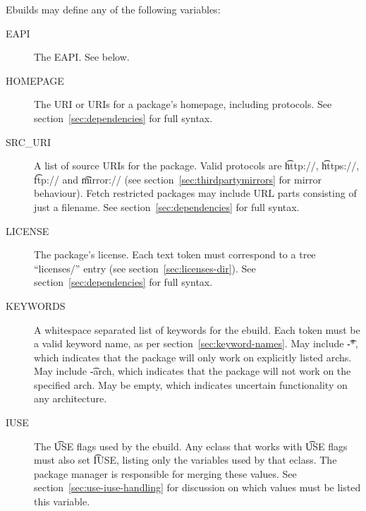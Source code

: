 Ebuilds may define any of the following variables:

\begin{description}
\item[EAPI] The EAPI. See below.
\item[HOMEPAGE] The URI or URIs for a package's homepage, including protocols.
    See section~\ref{sec:dependencies} for full syntax.
\item[SRC\_URI] A list of source URIs for the package. Valid protocols are \t{http://},
    \t{https://}, \t{ftp://} and \t{mirror://} (see section~\ref{sec:thirdpartymirrors} for mirror
    behaviour). Fetch restricted packages may include URL parts consisting of just a filename.
    See section~\ref{sec:dependencies} for full syntax.
\item[LICENSE] The package's license. Each text token must correspond to a tree ``licenses/'' entry
    (see section~\ref{sec:licenses-dir}). See section~\ref{sec:dependencies} for full syntax.
    \label{ebuild-var-LICENSE}
\item[KEYWORDS] A whitespace separated list of keywords for the ebuild. Each token must be a valid
    keyword name, as per section~\ref{sec:keyword-names}. May include \t{-*}, which indicates that
    the package will only work on explicitly listed archs. May include \t{-arch}, which indicates
    that the package will not work on the specified arch. May be empty, which indicates uncertain
    functionality on any architecture.
\item[IUSE] The \t{USE} flags used by the ebuild. Any eclass that works with \t{USE} flags must
    also set \t{IUSE}, listing only the variables used by that eclass. The package manager is
    responsible for merging these values. See section~\ref{sec:use-iuse-handling} for discussion on
    which values must be listed this variable.


\end{description}
